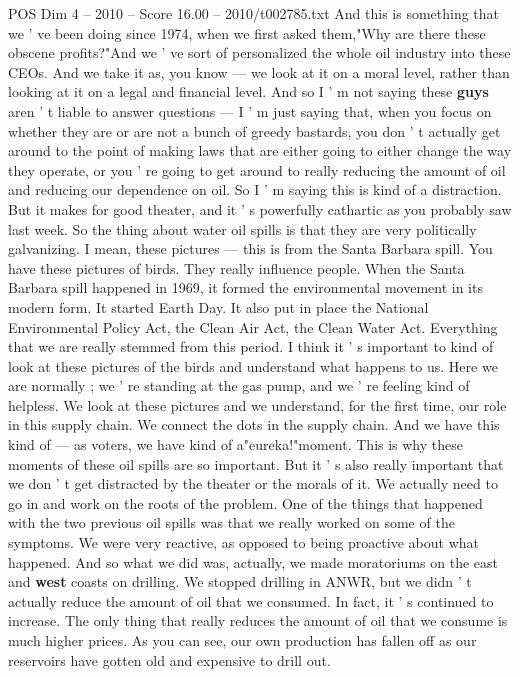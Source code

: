 \begin{textsample}{POS Dim 4 – 2010 – Score 16.00 – 2010/t002785.txt}
And this is something that we ' ve been doing since 1974, when we first asked them,"Why are there these obscene profits?"And we ' ve sort of personalized the whole oil industry into these CEOs.
And we take it as, you know — we look at it on a moral level, rather than looking at it on a legal and financial level.
And so I ' m not saying these \textbf{guys} aren ' t liable to answer questions — I ' m just saying that, when you focus on whether they are or are not a bunch of greedy bastards, you don ' t actually get around to the point of making laws that are either going to either change the way they operate, or you ' re going to get around to really reducing the amount of oil and reducing our dependence on oil.
So I ' m saying this is kind of a distraction.
But it makes for good theater, and it ' s powerfully cathartic as you probably saw last week.
So the thing about water oil spills is that they are very politically galvanizing.
I mean, these pictures — this is from the Santa Barbara spill.
You have these pictures of birds.
They really influence people.
When the Santa Barbara spill happened in 1969, it formed the environmental movement in its modern form.
It started Earth Day.
It also put in place the National Environmental Policy Act, the Clean Air Act, the Clean Water Act.
Everything that we are really stemmed from this period.
I think it ' s important to kind of look at these pictures of the birds and understand what happens to us.
Here we are normally ; we ' re standing at the gas pump, and we ' re feeling kind of helpless.
We look at these pictures and we understand, for the first time, our role in this supply chain.
We connect the dots in the supply chain.
And we have this kind of — as voters, we have kind of a"eureka!"moment.
This is why these moments of these oil spills are so important.
But it ' s also really important that we don ' t get distracted by the theater or the morals of it.
We actually need to go in and work on the roots of the problem.
One of the things that happened with the two previous oil spills was that we really worked on some of the symptoms.
We were very reactive, as opposed to being proactive about what happened.
And so what we did was, actually, we made moratoriums on the east and \textbf{west} coasts on drilling.
We stopped drilling in ANWR, but we didn ' t actually reduce the amount of oil that we consumed.
In fact, it ' s continued to increase.
The only thing that really reduces the amount of oil that we consume is much higher prices.
As you can see, our own production has fallen off as our reservoirs have gotten old and expensive to drill out.

\end{textsample}
